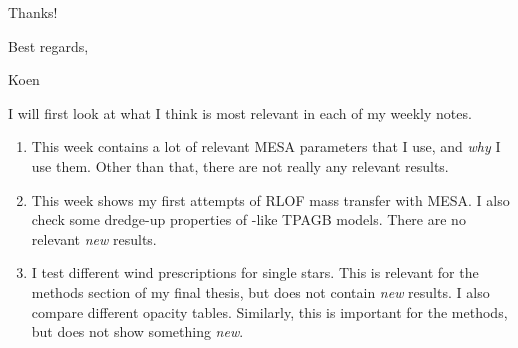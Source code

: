 \documentclass[a4paper,10pt]{article}
\begin{document}
Thanks!

Best regards,

Koen


I will first look at what I think is most relevant in each of my weekly notes.

\begin{enumerate}
	\item[\color{keywordscolor}2 -- 3.] This week contains a lot of relevant MESA parameters that I use, and
	      \emph{why}
	      I use them.
	      Other than that, there are not really any relevant results.
	\item[\color{keywordscolor}4.] This week shows my first attempts of RLOF mass transfer with MESA.
	      I also check some dredge-up properties of \citet{rees2024b}-like TPAGB models.
	      There are no
	      relevant \emph{new} results.
	\item[\color{keywordscolor}5.] I test different wind prescriptions for single stars.
	      This is relevant for the methods section of my final thesis, but does not contain \emph{new} results.
	      I also compare different opacity tables.
	      Similarly, this is important for the methods, but does not show something \emph{new}.


\end{enumerate}
\end{document}
